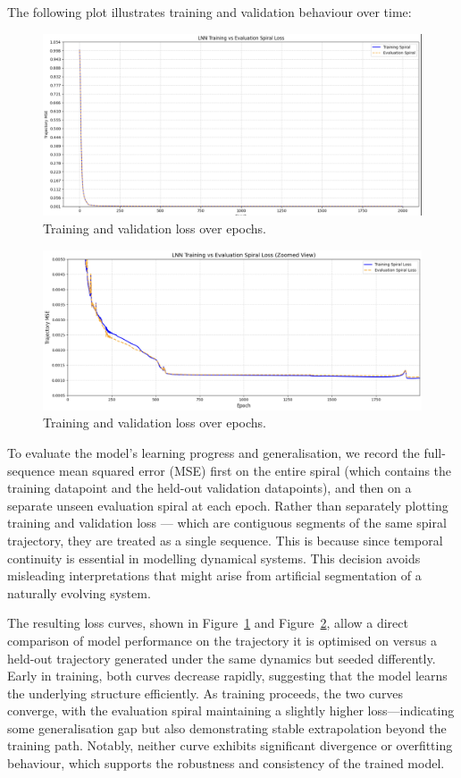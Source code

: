 
\noindent The following plot illustrates training and validation behaviour over time:

\begin{figure}[H]
    \centering
    \includegraphics[width=0.8\linewidth]{img/lnn_loss_curve.png}
    \caption{Training and validation loss over epochs.}
    \label{fig:lnn_loss}
\end{figure}

\begin{figure}[H]
    \centering
    \includegraphics[width=0.8\linewidth]{img/lnn_loss_curve_zoomed.png}
    \caption{Training and validation loss over epochs.}
    \label{fig:lnn_loss_zoomed}
\end{figure}

To evaluate the model's learning progress and generalisation, we record the full-sequence mean squared error (MSE) first on the entire spiral (which contains the training datapoint and the held-out validation datapoints), and then on a separate unseen evaluation spiral at each epoch. Rather than separately plotting training and validation loss — which are contiguous segments of the same spiral trajectory, they are treated as a single sequence. This is because since temporal continuity is essential in modelling dynamical systems. This decision avoids misleading interpretations that might arise from artificial segmentation of a naturally evolving system.

The resulting loss curves, shown in Figure~\ref{fig:lnn_loss} and Figure~\ref{fig:lnn_loss_zoomed}, allow a direct comparison of model performance on the trajectory it is optimised on versus a held-out trajectory generated under the same dynamics but seeded differently. Early in training, both curves decrease rapidly, suggesting that the model learns the underlying structure efficiently. As training proceeds, the two curves converge, with the evaluation spiral maintaining a slightly higher loss—indicating some generalisation gap but also demonstrating stable extrapolation beyond the training path. Notably, neither curve exhibits significant divergence or overfitting behaviour, which supports the robustness and consistency of the trained model.

